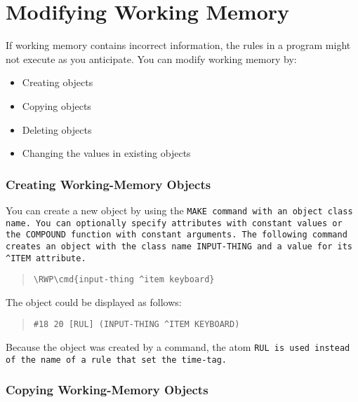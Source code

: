\section{Modifying Working Memory}

If working memory contains incorrect information, the rules in a
program might not execute as you anticipate. You can modify
working memory by:

\begin{itemize}
  \item Creating objects
  \item Copying objects
  \item Deleting objects
  \item Changing the values in existing objects
\end{itemize}

\subsubsection{Creating Working-Memory Objects}

You can create a new object by using the \tt{MAKE} command with an
object class name. You can optionally specify attributes with constant
values or the \tt{COMPOUND} function with constant arguments. The
following command creates an object with the class name
\tt{INPUT-THING} and a value for its \verb|^ITEM| attribute.

\begin{quote}
\begin{Verbatim}[commandchars=\\\{\}]
\RWP\cmd{input-thing ^item keyboard}
\end{Verbatim}
\end{quote}

The object could be displayed as follows:

\begin{quote}
\begin{verbatim}
#18 20 [RUL] (INPUT-THING ^ITEM KEYBOARD)
\end{verbatim}
\end{quote}  

Because the object was created by a command, the atom \tt{RUL} is used
instead of the name of a rule that set the time-tag.

\subsubsection{Copying Working-Memory Objects}

